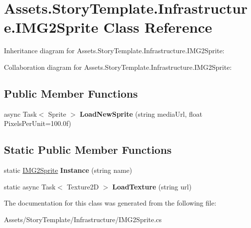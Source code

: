 \hypertarget{classAssets_1_1StoryTemplate_1_1Infrastructure_1_1IMG2Sprite}{}\section{Assets.\+Story\+Template.\+Infrastructure.\+I\+M\+G2\+Sprite Class Reference}
\label{classAssets_1_1StoryTemplate_1_1Infrastructure_1_1IMG2Sprite}


Inheritance diagram for Assets.\+Story\+Template.\+Infrastructure.\+I\+M\+G2\+Sprite\+:


Collaboration diagram for Assets.\+Story\+Template.\+Infrastructure.\+I\+M\+G2\+Sprite\+:
\subsection*{Public Member Functions}
\begin{DoxyCompactItemize}
\item 
async Task$<$ Sprite $>$ {\bfseries Load\+New\+Sprite} (string media\+Url, float Pixels\+Per\+Unit=100.\+0f)\hypertarget{classAssets_1_1StoryTemplate_1_1Infrastructure_1_1IMG2Sprite_a7f85b61c8138ca7c55148f74f6ff8e30}{}\label{classAssets_1_1StoryTemplate_1_1Infrastructure_1_1IMG2Sprite_a7f85b61c8138ca7c55148f74f6ff8e30}

\end{DoxyCompactItemize}
\subsection*{Static Public Member Functions}
\begin{DoxyCompactItemize}
\item 
static \hyperlink{classAssets_1_1StoryTemplate_1_1Infrastructure_1_1IMG2Sprite}{I\+M\+G2\+Sprite} {\bfseries Instance} (string name)\hypertarget{classAssets_1_1StoryTemplate_1_1Infrastructure_1_1IMG2Sprite_a974a5039507529bfb6a68525dce9226d}{}\label{classAssets_1_1StoryTemplate_1_1Infrastructure_1_1IMG2Sprite_a974a5039507529bfb6a68525dce9226d}

\item 
static async Task$<$ Texture2D $>$ {\bfseries Load\+Texture} (string url)\hypertarget{classAssets_1_1StoryTemplate_1_1Infrastructure_1_1IMG2Sprite_ab3e06b4d02d6c700a922c19e2a2f47b2}{}\label{classAssets_1_1StoryTemplate_1_1Infrastructure_1_1IMG2Sprite_ab3e06b4d02d6c700a922c19e2a2f47b2}

\end{DoxyCompactItemize}


The documentation for this class was generated from the following file\+:\begin{DoxyCompactItemize}
\item 
Assets/\+Story\+Template/\+Infrastructure/I\+M\+G2\+Sprite.\+cs\end{DoxyCompactItemize}
